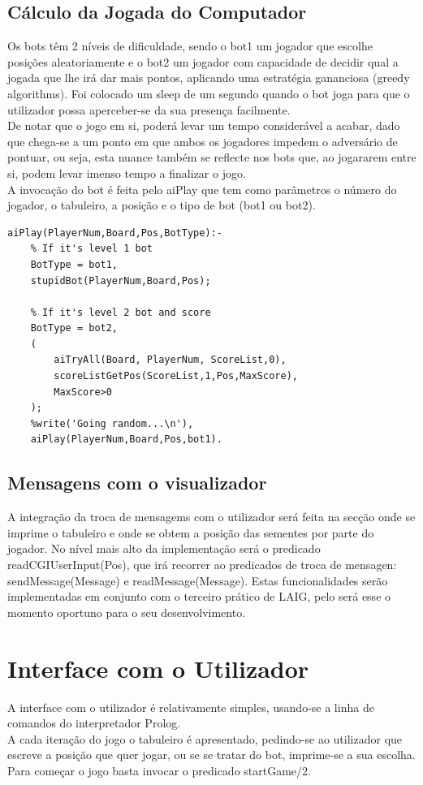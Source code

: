\documentclass[15pt,a4paper]{article}
\begin{document}
\subsection{Cálculo da Jogada do Computador}
Os bots têm 2 níveis de dificuldade, sendo o bot1 um jogador que escolhe posições aleatoriamente e o bot2 um jogador com capacidade de decidir qual a jogada que lhe irá dar mais pontos, aplicando uma estratégia gananciosa (greedy algorithms). Foi colocado um sleep de um segundo quando o bot joga para que o utilizador possa aperceber-se da sua presença facilmente.\\
\indent De notar que o jogo em si, poderá levar um tempo considerável a acabar, dado que chega-se a um ponto em que ambos os jogadores impedem o adversário de pontuar, ou seja, esta nuance também se reflecte nos bots que, ao jogararem entre si, podem levar imenso tempo a finalizar o jogo.\\
\indent A invocação do bot é feita pelo aiPlay que tem como parâmetros o número do jogador, o tabuleiro, a posição e o tipo de bot (bot1 ou bot2).

\begin{verbatim}
aiPlay(PlayerNum,Board,Pos,BotType):-
	% If it's level 1 bot
	BotType = bot1,
	stupidBot(PlayerNum,Board,Pos);

	% If it's level 2 bot and score
	BotType = bot2,
	(
		aiTryAll(Board, PlayerNum, ScoreList,0),
		scoreListGetPos(ScoreList,1,Pos,MaxScore),
		MaxScore>0
	);
	%write('Going random...\n'),
	aiPlay(PlayerNum,Board,Pos,bot1).

\end{verbatim}


\subsection{Mensagens com o visualizador}
A integração da troca de mensagems com o utilizador será feita na secção onde se imprime o tabuleiro e onde se obtem a posição das sementes por parte do jogador. No nível mais alto da implementação será o predicado readCGIUserInput(Pos), que irá recorrer ao predicados de troca de mensagen: sendMessage(Message) e readMessage(Message). Estas funcionalidades serão implementadas em conjunto com o terceiro prático de LAIG, pelo será esse o momento oportuno para o seu desenvolvimento.

\section{Interface com o Utilizador}
A interface com o utilizador é relativamente simples, usando-se a linha de comandos do interpretador Prolog. \\
\indent A cada iteração do jogo o tabuleiro é apresentado, pedindo-se ao utilizador que escreve a posição que quer jogar, ou se se tratar do bot, imprime-se a sua escolha. Para começar o jogo basta invocar o predicado startGame/2.
\end{document}
